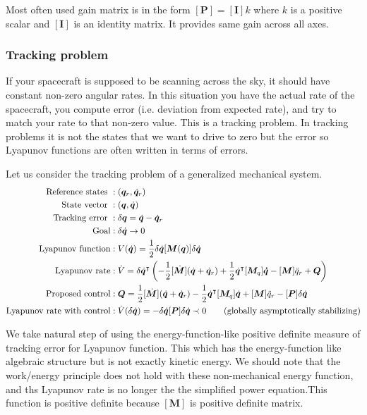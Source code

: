 \documentclass{article}
\begin{document}
Most often used gain matrix is in the form $[\bm{P}]=[\bm{I}]k$ where $k$ is a positive scalar and $[\bm{I}]$ is an identity matrix. It provides same gain across all axes.

\subsubsection{Tracking problem}
If your spacecraft is supposed to be scanning across the sky, it should have constant non-zero angular rates. In this situation you have the actual rate of the spacecraft, you compute error (i.e. deviation from expected rate), and try to match your rate to that non-zero value. This is a tracking problem. In tracking problems it is not the states that we want to drive to zero but the error so Lyapunov functions are often written in terms of errors.

Let us consider the tracking problem of a generalized mechanical system.
\begin{equation*}
  \begin{split}
  \textnormal{Reference states }&:(\bm{q}_{r},\dot{\bm{q}}_{r})\\
  \textnormal{State vector }&:(\bm{q},\dot{\bm{q}})\\
  \textnormal{Tracking error }&:\delta\bm{q}=\dot{\bm{q}}-\dot{\bm{q}}_{r}\\
  \textnormal{Goal}&:\delta\dot{\bm{q}}\rightarrow0\\
  \textnormal{Lyapunov function}&:V(\dot{\bm{q}})=\frac{1}{2}\delta\dot{\bm{q}}[\bm{M}(\bm{q})]\delta\dot{\bm{q}}\\
  \textnormal{Lyapunov rate}&:\dot{V}=\delta\dot{\bm{q}}^{\intercal}\left(-\frac{1}{2}[\dot{\bm{M}}](\dot{\bm{q}}+\dot{\bm{q}}_{r})+\frac{1}{2}\dot{\bm{q}}^{\intercal}[\bm{M}_{q}]\bm{\dot{q}}-[\bm{M}]\ddot{q}_{r}+\bm{Q}\right)\\
  \textnormal{Proposed control}&:\bm{Q}=\frac{1}{2}[\dot{\bm{M}}](\dot{\bm{q}}+\dot{\bm{q}}_{r})-\frac{1}{2}\dot{\bm{q}}^{\intercal}[\bm{M}_{q}]\dot{\bm{q}}+[\bm{M}]\ddot{q}_{r}-[\bm{P}]\delta\dot{\bm{q}}\\
  \textnormal{Lyapunov rate with control}&:\dot{V}(\delta\dot{\bm{q}})=-\delta\dot{\bm{q}}[\bm{P}]\delta\dot{\bm{q}}\prec0\quad\quad\textnormal{(globally asymptotically stabilizing)}
  \end{split}
\end{equation*}

We take natural step of using the energy-function-like positive definite measure of tracking error for Lyapunov function. This which has the energy-function like algebraic structure but is not exactly kinetic energy. We should note that the work/energy principle does not hold with these non-mechanical energy function, and ths Lyapunov rate is no longer the the simplified power equation.This function is positive definite because $[\bm{M}]$ is positive definite matrix. 
\end{document}
